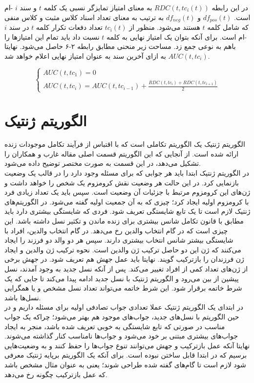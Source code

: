 در این رابطه
$RDC(t, tc_i(t))$
به معنای امتیاز تمایزگر نسبی یک کلمه
$t$
و سند
$i$
-ام است.
$df_{pos}(t)$
و
$df_{neg}(t)$
به ترتیب به معنای تعداد اسناد کلاس مثبت و کلاس منفی که شامل کلمه
$t$
هستند می‌شود. منظور از
$tc_i(t)$
تعداد دفعات تکرار کلمه
$t$
در سند
$i$
-ام است. برای آنکه بتوان یک امتیاز نهایی به کلمه
$t$
نسبت داد باید تمام این امتیازها را باهم به نوعی جمع زد. مساحت زیر منحنی مطابق رابطه ۲-۶ حاصل می‌شود. نهایتا
$AUC(t,tc_i)$
به ازای آخرین سند به عنوان امتیاز نهایی اعلام خواهد شد.

\begin{equation}
\begin{cases}
AUC(t,tc_1) = 0 \\
AUC(t,tc_i) = AUC(t,tc_{i-1}) + \frac{RDC(t,tc_i)+RDC(t,tc_{i+1})}{2}
\end{cases}
\end{equation}

\section{الگوریتم ژنتیک}
الگوریتم ژنتیک یک الگوریتم تکاملی است که با اقتباس از فرآیند تکامل موجودات زنده ارائه شده است. از آنجایی که این الگوریتم قسمت اصلی مقاله غارب و همکاران\cite{ghareb2016hybrid} را تشکیل می‌دهد، در این قسمت به صورت مختصر توضیح داده می‌شود.
\\

در الگوریتم ژنتیک ابتدا باید هر جوابی که برای مسئله وجود دارد را در قالب یک وضعیت بازنمایی کرد. در این حالت هر وضعیت نقش کرومزوم یک شخص را خواهد داشت و ژن‌های این کرومزوم مرتبط با جزئیات آن وضعیت است. سپس باید یک تعداد زیادی فرد با کرومزوم اولیه ایجاد کرد؛ چیزی که به آن جمعیت اولیه گفته می‌شود. در الگوریتم‌های ژنتیک لازم است تا یک تابع شایستگی تعریف شود. فردی که شایستگی بیشتری دارد باید مطابق با قانون تکامل شانس بیشتری برای زنده ماندن و تکثیر نسل داشته باشد. این چیزی است که در گام انتخاب والدین رخ می‌دهد. در گام انتخاب والدین، افراد با شایستگی بیشتر شانس انتخاب بیشتری دارند. سپس هر دو والد دو فرزند را ایجاد می‌کنند که ژن این دو حاصل ترکیب ژن والدین است. نحوه ترکیب ژن والدین و ایجاد ژن فرزندان را بازترکیب گویند. نهایتا باید عمل جهش هم تعریف شود. در جهش برخی از ژن‌های تعداد کمی از افراد تغییر می‌کند. پس از آنکه نسل جدید به وجود آمدند، نسل پیشین از بین می‌رود و الگوریتم ژنتیک با نسل جدید ادامه پیدا می‌کند تا جایی که یک شرط خاتمه برقرار شود. این شرط خاتمه می‌تواند تعداد نسل مشخص و یا همگرایی نسل‌ها باشد.
\\

در ابتدای یک الگوریتم ژنتیک عملا تعدادی جواب تصادفی اولیه برای مسئله داریم و در حین الگوریتم با نسل‌های جدید، جواب‌های موجود هم بهتر می‌شود؛ چراکه یک جواب مناسب در صورتی که تابع شایستگی به خوبی تعریف شده باشد، منجر به ایجاد جواب‌های بیشتری مبتنی بر خود می‌شود و جواب‌ها نامناسب کنار گذاشته می‌شوند. نهایتا آنکه عمل بازترکیب و جهش می‌توانند تنوع جواب‌ها را حفظ کنند و به وضعیت‌هایی برسیم که در ابتدا قابل ساختن نبوده است. برای آنکه یک الگوریتم برپایه ژنتیک معرفی شود لازم است تا گام‌های گفته شده طراحی شوند؛ یعنی به عنوان مثال مشخص باشد که عمل بازترکیب چگونه رخ می‌دهد.